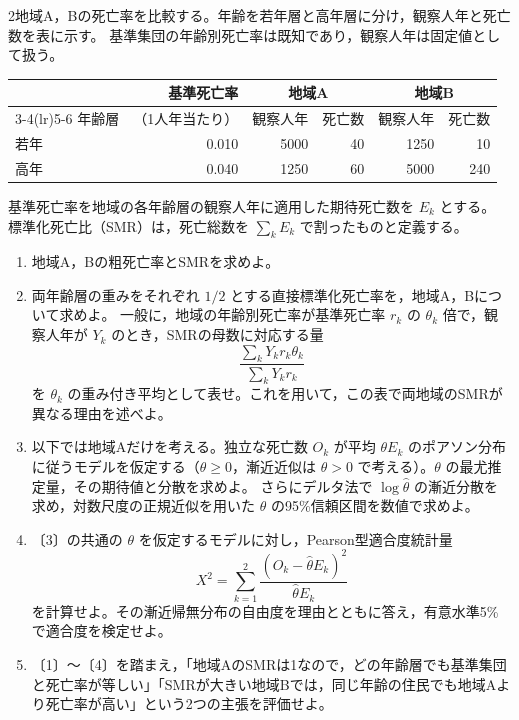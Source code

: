 \documentclass[a4paper,11pt]{ltjsarticle}
\begin{document}
2地域A，Bの死亡率を比較する。年齢を若年層と高年層に分け，観察人年と死亡数を表に示す。
基準集団の年齢別死亡率は既知であり，観察人年は固定値として扱う。
\begin{center}
\begin{tabular}{lrrrrr}
\toprule
 & 基準死亡率 & \multicolumn{2}{c}{地域A} & \multicolumn{2}{c}{地域B}\\
\cmidrule(lr){3-4}\cmidrule(lr){5-6}
年齢層 & （1人年当たり） & 観察人年 & 死亡数 & 観察人年 & 死亡数\\
\midrule
若年 & 0.010 & 5000 & 40 & 1250 & 10\\
高年 & 0.040 & 1250 & 60 & 5000 & 240\\
\bottomrule
\end{tabular}
\end{center}
基準死亡率を地域の各年齢層の観察人年に適用した期待死亡数を $E_k$ とする。
標準化死亡比（SMR）は，死亡総数を $\sum_kE_k$ で割ったものと定義する。
\begin{enumerate}
\item 地域A，Bの粗死亡率とSMRを求めよ。
\item 両年齢層の重みをそれぞれ $1/2$ とする直接標準化死亡率を，地域A，Bについて求めよ。
一般に，地域の年齢別死亡率が基準死亡率 $r_k$ の $\theta_k$ 倍で，観察人年が $Y_k$ のとき，SMRの母数に対応する量
\[
\frac{\sum_kY_kr_k\theta_k}{\sum_kY_kr_k}
\]
を $\theta_k$ の重み付き平均として表せ。これを用いて，この表で両地域のSMRが異なる理由を述べよ。
\item 以下では地域Aだけを考える。独立な死亡数 $O_k$ が平均 $\theta E_k$ のポアソン分布に従うモデルを仮定する（$\theta\geq0$，漸近近似は $\theta>0$ で考える）。$\theta$ の最尤推定量，その期待値と分散を求めよ。
さらにデルタ法で $\log\hat\theta$ の漸近分散を求め，対数尺度の正規近似を用いた $\theta$ の95\%信頼区間を数値で求めよ。
\item 〔3〕の共通の $\theta$ を仮定するモデルに対し，Pearson型適合度統計量
\[
X^2=\sum_{k=1}^{2}\frac{(O_k-\hat\theta E_k)^2}{\hat\theta E_k}
\]
を計算せよ。その漸近帰無分布の自由度を理由とともに答え，有意水準5\%で適合度を検定せよ。
\item 〔1〕～〔4〕を踏まえ，「地域AのSMRは1なので，どの年齢層でも基準集団と死亡率が等しい」「SMRが大きい地域Bでは，同じ年齢の住民でも地域Aより死亡率が高い」という2つの主張を評価せよ。
\end{enumerate}
\newpage
\end{document}
